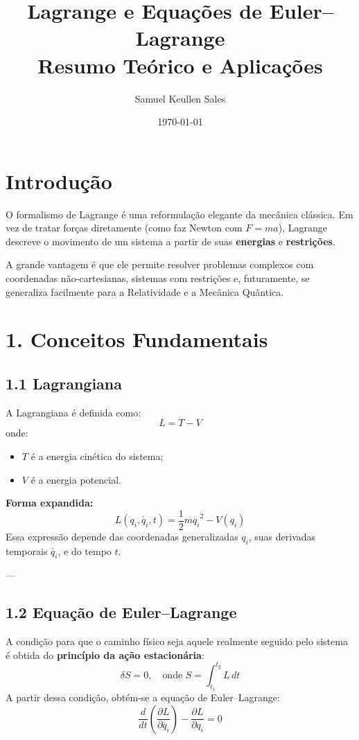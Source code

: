 \documentclass[a4paper,12pt]{article}
\title{Lagrange e Equações de Euler–Lagrange \\ \small{Resumo Teórico e Aplicações}}
\author{Samuel Keullen Sales}
\date{\today}
\begin{document}
\maketitle

\section*{Introdução}
O formalismo de Lagrange é uma reformulação elegante da mecânica clássica.
Em vez de tratar forças diretamente (como faz Newton com $F = ma$), 
Lagrange descreve o movimento de um sistema a partir de suas \textbf{energias} e \textbf{restrições}.

A grande vantagem é que ele permite resolver problemas complexos com coordenadas não-cartesianas,
sistemas com restrições e, futuramente, se generaliza facilmente para a Relatividade e a Mecânica Quântica.

\section*{1. Conceitos Fundamentais}

\subsection*{1.1 Lagrangiana}
A Lagrangiana é definida como:
\[
L = T - V
\]
onde:
\begin{itemize}
    \item $T$ é a energia cinética do sistema;
    \item $V$ é a energia potencial.
\end{itemize}

\noindent
\textbf{Forma expandida:}
\[
L(q_i, \dot{q_i}, t) = \frac{1}{2} m \dot{q_i}^2 - V(q_i)
\]
Essa expressão depende das coordenadas generalizadas $q_i$, suas derivadas temporais $\dot{q_i}$, e do tempo $t$.

---

\subsection*{1.2 Equação de Euler–Lagrange}
A condição para que o caminho físico seja aquele realmente seguido pelo sistema é obtida do \textbf{princípio da ação estacionária}:
\[
\delta S = 0, \quad \text{onde } S = \int_{t_1}^{t_2} L \, dt
\]
A partir dessa condição, obtém-se a equação de Euler–Lagrange:
\[
\frac{d}{dt}\left( \frac{\partial L}{\partial \dot{q_i}} \right) - \frac{\partial L}{\partial q_i} = 0
\]
\end{document}
